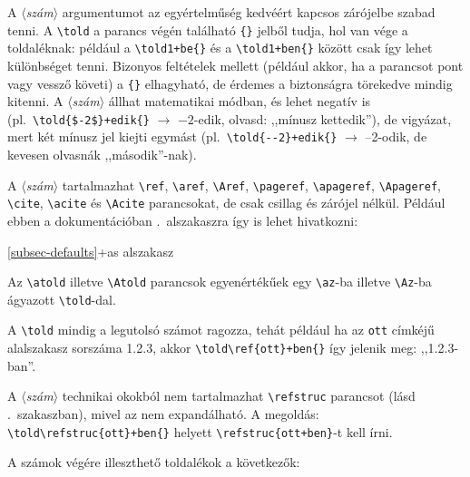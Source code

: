 \documentclass[12pt]{article}
\newcommand\param[1]{{\normalfont\slshape$\langle$#1$\rangle$}}
\begin{document}
A \param{szám} argumentumot az egyértelműség kedvéért kapcsos zárójelbe szabad tenni.
A \verb|\told| a parancs végén található \verb|{}| jelből tudja, hol van vége a toldaléknak: például a \verb|\told1+be{}| és a \verb|\told1+ben{}| között csak így lehet különbséget tenni.
Bizonyos feltételek mellett (például akkor, ha a parancsot pont vagy vessző követi) a \verb|{}| elhagyható, de érdemes a biztonságra törekedve mindig kitenni.
A \param{szám} állhat matematikai módban, és lehet negatív is (pl.~\verb|\told{$-2$}+edik{}| $\to$ $-2$-edik, olvasd: ,,mínusz kettedik''), de vigyázat, mert két mínusz jel kiejti egymást (pl.~\verb|\told{--2}+edik{}| $\to$ --2-odik, de kevesen olvasnák ,,második''-nak).

A \param{szám} tartalmazhat \verb|\ref|, \verb|\aref|, \verb|\Aref|, \verb|\pageref|, \verb|\apageref|, \verb|\Apageref|, \verb|\cite|, \verb|\acite| és \verb|\Acite| parancsokat, de csak csillag és zárójel nélkül.
Például ebben a dokumentációban .~alszakaszra így is lehet hivatkozni:

\begin{latexexample}
\told\ref{subsec-defaults}+as{} 
alszakasz
\end{latexexample}

Az \verb|\atold| illetve \verb|\Atold| parancsok egyenértékűek egy \verb|\az|-ba illetve \verb|\Az|-ba ágyazott \verb|\told|-dal.

A \verb|\told| mindig a legutolsó számot ragozza, tehát például ha az \texttt{ott} címkéjű alalszakasz sorszáma 1.2.3, akkor \verb|\told\ref{ott}+ben{}| így jelenik meg: ,,1.2.3-ban''.

A \param{szám} technikai okokból nem tartalmazhat \verb|\refstruc| parancsot (lásd .~szakaszban), mivel az nem expandálható. A megoldás: \verb|\told\refstruc{ott}+ben{}| helyett \verb|\refstruc{ott+ben}|-t kell írni.

A számok végére illeszthető toldalékok a következők:
\end{document}
